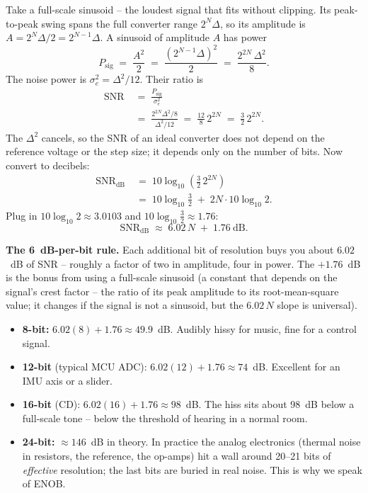 Take a full-scale sinusoid -- the loudest signal that fits without clipping. Its peak-to-peak
swing spans the full converter range $2^N \Delta$, so its amplitude is $A = 2^N\Delta/2 = 2^{N-1}\Delta$.
A sinusoid of amplitude $A$ has power
\[
  P_{\mathrm{sig}} \;=\; \frac{A^2}{2} \;=\; \frac{(2^{N-1}\Delta)^2}{2}
  \;=\; \frac{2^{2N}\,\Delta^2}{8}.
\]
The noise power is $\sigma_e^2 = \Delta^2/12$. Their ratio is
\begin{align*}
  \mathrm{SNR} \;&=\; \frac{P_{\mathrm{sig}}}{\sigma_e^2} \\
  \;&=\; \frac{2^{2N}\Delta^2/8}{\Delta^2/12} \;=\; \frac{12}{8}\,2^{2N}
  \;=\; \frac{3}{2}\,2^{2N}.
\end{align*}
The $\Delta^2$ cancels, so the SNR of an ideal converter does not
depend on the reference voltage or the step size; it depends only on the number of bits. Now
convert to decibels:
\begin{align*}
  \mathrm{SNR}_{\mathrm{dB}} \;&=\; 10\log_{10}\!\left(\frac{3}{2}\,2^{2N}\right) \\
  \;&=\; 10\log_{10}\tfrac{3}{2} \;+\; 2N\cdot 10\log_{10} 2.
\end{align*}
Plug in $10\log_{10}2 \approx 3.0103$ and $10\log_{10}\tfrac32 \approx 1.76$:
\[
  \boxed{\;\mathrm{SNR}_{\mathrm{dB}} \;\approx\; 6.02\,N \;+\; 1.76 \ \text{dB}.\;}
\]

\begin{focusbox}
\textbf{The 6~dB-per-bit rule.} Each additional bit of resolution buys you about $6.02$~dB of
SNR -- roughly a factor of two in amplitude, four in power. The $+1.76$~dB is the bonus from
using a full-scale sinusoid (a constant that depends on the signal's crest factor -- the ratio of its peak amplitude to its root-mean-square value; it changes if
the signal is not a sinusoid, but the $6.02\,N$ slope is universal).
\end{focusbox}

\begin{example}
\label{ch19:ex-snr}
\begin{itemize}
  \item \textbf{8-bit:} $6.02(8) + 1.76 \approx 49.9$~dB. Audibly hissy for music, fine for a
        control signal.
  \item \textbf{12-bit} (typical MCU ADC): $6.02(12)+1.76 \approx 74$~dB. Excellent for an IMU
        axis or a slider.
  \item \textbf{16-bit} (CD): $6.02(16)+1.76 \approx 98$~dB. The hiss sits about 98~dB below a
        full-scale tone -- below the threshold of hearing in a normal room.
  \item \textbf{24-bit:} $\approx 146$~dB in theory. In practice the analog electronics
        (thermal noise in resistors, the reference, the op-amps) hit a wall around 20--21 bits
        of \emph{effective} resolution; the last bits are buried in real noise. This is why we
        speak of ENOB.
\end{itemize}
\end{example}


